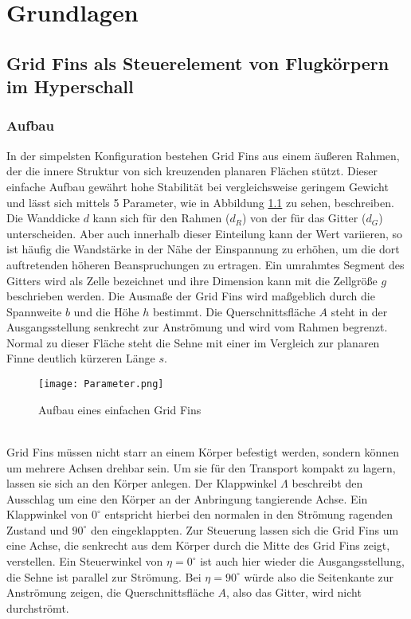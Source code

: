 \chapter{Grundlagen}
\label{sec:grundlagen}

\section{Grid Fins als Steuerelement von Flugkörpern im Hyperschall}
\subsection{Aufbau}
In der simpelsten Konfiguration bestehen Grid Fins aus einem äußeren Rahmen, der die innere Struktur von sich kreuzenden planaren Flächen stützt. Dieser einfache Aufbau gewährt hohe Stabilität bei vergleichsweise geringem Gewicht \cite{zellform} und lässt sich mittels 5 Parameter, wie in Abbildung \ref{abb_parameter} zu sehen, beschreiben. Die Wanddicke $d$ kann sich für den Rahmen ($d_R$) von der für das Gitter ($d_G$) unterscheiden. Aber auch innerhalb dieser Einteilung kann der Wert variieren, so ist häufig die Wandstärke in der Nähe der Einspannung zu erhöhen, um die dort auftretenden höheren Beanspruchungen zu ertragen. Ein umrahmtes Segment des Gitters wird als Zelle bezeichnet und ihre Dimension kann mit die Zellgröße $g$ beschrieben werden. Die Ausmaße der Grid Fins wird maßgeblich durch die Spannweite $b$ und die Höhe $h$ bestimmt. Die Querschnittsfläche $A$ steht in der Ausgangsstellung senkrecht zur Anströmung und wird vom Rahmen begrenzt. Normal zu dieser Fläche steht die Sehne mit einer im Vergleich zur planaren Finne deutlich kürzeren Länge $s$.\\
\begin{figure}[h]
	\centering
	\texttt{[image: Parameter.png]}
	\caption{Aufbau eines einfachen Grid Fins}
	\label{abb_parameter}
\end{figure}\\
Grid Fins müssen nicht starr an einem Körper befestigt werden, sondern können um mehrere Achsen drehbar sein. Um sie für den Transport kompakt zu lagern, lassen sie sich an den Körper anlegen. Der Klappwinkel $\Lambda$ beschreibt den Ausschlag um eine den Körper an der Anbringung tangierende Achse. Ein Klappwinkel von $0^\circ$ entspricht hierbei den normalen in den Strömung ragenden Zustand und $90^\circ$ den eingeklappten. Zur Steuerung lassen sich die Grid Fins um eine Achse, die senkrecht aus dem Körper durch die Mitte des Grid Fins zeigt, verstellen. Ein Steuerwinkel von $\eta = 0^\circ$ ist auch hier wieder die Ausgangsstellung, die Sehne ist parallel zur Strömung. Bei $\eta = 90^\circ$ würde also die Seitenkante zur Anströmung zeigen, die Querschnittsfläche $A$, also das Gitter, wird nicht durchströmt.\\
